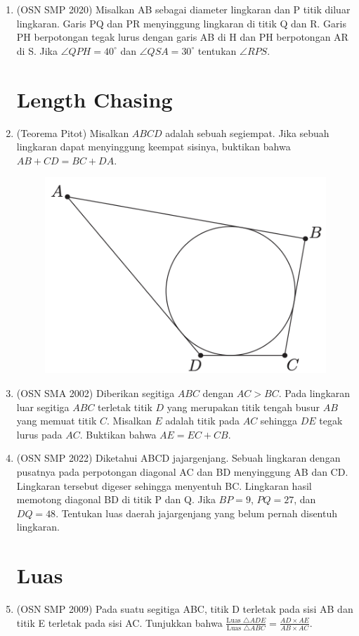 \documentclass[a4paper, 12pt]{article}
\begin{document}
\begin{enumerate}
    \item (OSN SMP 2020) Misalkan AB sebagai diameter lingkaran dan P titik diluar lingkaran. Garis PQ dan PR menyinggung lingkaran di titik Q dan R. Garis PH berpotongan tegak lurus dengan garis AB di H dan PH berpotongan AR di S. Jika $\angle QPH=40^{\circ}$ dan $\angle QSA=30^{\circ}$ tentukan $\angle RPS$.
        
\section{Length Chasing}
    \item (Teorema Pitot) Misalkan $ABCD$ adalah sebuah segiempat. Jika sebuah lingkaran dapat menyinggung keempat sisinya, buktikan bahwa $AB + CD = BC + DA$.
    \begin{figure}[H]
        \includegraphics[width=0.4\linewidth]{0Figure/pitot-theorem.png}
    \end{figure}

    \item (OSN SMA 2002)
    Diberikan segitiga $ABC$ dengan $AC > BC$. Pada lingkaran luar segitiga $ABC$ terletak titik $D$ yang merupakan titik tengah busur $AB$ yang memuat titik $C$. Misalkan $E$ adalah titik pada $AC$ sehingga $DE$ tegak lurus pada $AC$. Buktikan bahwa $AE = EC + CB$.

    \item (OSN SMP 2022) Diketahui ABCD jajargenjang. Sebuah lingkaran dengan pusatnya pada perpotongan diagonal AC dan BD menyinggung AB dan CD. Lingkaran tersebut digeser sehingga menyentuh BC. Lingkaran hasil memotong diagonal BD di titik P dan Q. Jika $BP=9$, $PQ=27$, dan $DQ=48$. Tentukan luas daerah jajargenjang yang belum pernah disentuh lingkaran.

\section{Luas}
    \item (OSN SMP 2009) Pada suatu segitiga ABC, titik D terletak pada sisi AB dan titik E terletak pada sisi AC. Tunjukkan bahwa $\frac{\text{Luas } \triangle ADE}{\text{Luas } \triangle ABC} = \frac{AD \times AE}{AB \times AC}$.


\end{enumerate}
\end{document}
